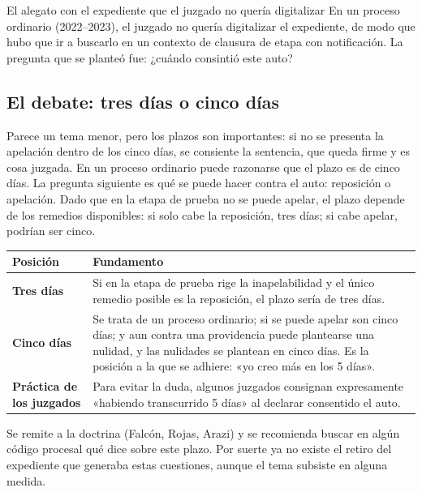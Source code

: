 \documentclass[12pt,oneside]{book}
\begin{document}
\begin{example}{El alegato con el expediente que el juzgado no quería digitalizar}
En un proceso ordinario (2022--2023), el juzgado no quería digitalizar el expediente, de modo que hubo que ir a buscarlo en un contexto de clausura de etapa con notificación. La pregunta que se planteó fue: ¿cuándo consintió este auto?
\end{example}

\subsection{El debate: tres días o cinco días}

Parece un tema menor, pero los plazos son importantes: si no se presenta la apelación dentro de los cinco días, se consiente la sentencia, que queda firme y es cosa juzgada. En un proceso ordinario puede razonarse que el plazo es de cinco días. La pregunta siguiente es qué se puede hacer contra el auto: reposición o apelación. Dado que en la etapa de prueba no se puede apelar, el plazo depende de los remedios disponibles: si solo cabe la reposición, tres días; si cabe apelar, podrían ser cinco.

\begin{table}[H]
\centering
\small
\begin{tabularx}{\textwidth}{L{0.22\textwidth} Y}
\toprule
\textbf{Posición} & \textbf{Fundamento} \\
\midrule
\textbf{Tres días} & Si en la etapa de prueba rige la inapelabilidad y el único remedio posible es la reposición, el plazo sería de tres días. \\
\textbf{Cinco días} & Se trata de un proceso ordinario; si se puede apelar son cinco días; y aun contra una providencia puede plantearse una nulidad, y las nulidades se plantean en cinco días. Es la posición a la que se adhiere: «yo creo más en los 5 días». \\
\textbf{Práctica de los juzgados} & Para evitar la duda, algunos juzgados consignan expresamente «habiendo transcurrido 5 días» al declarar consentido el auto. \\
\bottomrule
\end{tabularx}
\end{table}

Se remite a la doctrina (Falcón, Rojas, Arazi) y se recomienda buscar en algún código procesal qué dice sobre este plazo. Por suerte ya no existe el retiro del expediente que generaba estas cuestiones, aunque el tema subsiste en alguna medida.
\end{document}

